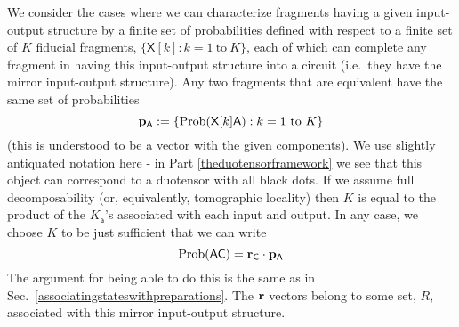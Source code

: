 \documentclass[10pt]{article}
\begin{document}
We consider the cases where we can characterize fragments having a given input-output structure by a finite set of probabilities defined
with respect to a finite set of $K$ fiducial fragments, $\{\mathsf{X}[k]: k=1~\text{to}~K \}$, each of which can complete any fragment in having this input-output structure into a circuit (i.e.\ they have the mirror input-output structure).  Any two fragments that are equivalent have the same set of probabilities
\begin{equation}
{\bf p}_\mathsf{A}:=\{ \text{Prob}(\mathsf{X}[k]\mathsf{A}): k=1~\text{to}~K\}
\end{equation}
(this is understood to be a vector with the given components).  We use slightly antiquated notation here - in Part \ref{theduotensorframework} we see that this object can correspond to a duotensor with all black dots.  If we assume full decomposability (or, equivalently, tomographic locality) then $K$ is equal to the product of the $K_\mathsf{a}$'s associated with each input and output.   In any case, we choose $K$ to be just sufficient that we can write
\begin{equation}\label{rdotpagain}
\text{Prob}(\mathsf{AC})= {\bf r}_\mathsf{C}\cdot {\bf p}_\mathsf{A}
\end{equation}
The argument for being able to do this is the same as in Sec.\ \ref{associatingstateswithpreparations}.  The ${\bf r}$ vectors belong to some set, $R$, associated with this mirror input-output structure.
\end{document}
